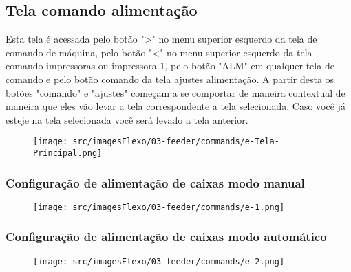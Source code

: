 \thispagestyle{fancy}
\vspace*{40 pt}
\subsection{Tela comando alimentação}\label{telaComandoAlimentacao}
 Esta tela é acessada pelo botão "\textgreater" no menu superior esquerdo da tela de comando de máquina, pelo botão "\textless{}" no menu superior esquerdo da tela 
 comando impressoras ou impressora 1, pelo botão "ALM" em qualquer tela de comando e pelo botão comando da tela ajustes alimentação. A partir desta os botões "comando" 
 e "ajustes" começam a se comportar de maneira contextual de maneira que eles vão levar a tela correspondente a tela selecionada. Caso você já esteje na tela selecionada 
 você será levado a tela anterior.
 \vspace*{\fill}
\begin{figure}[h]
  \centering
  \texttt{[image: src/imagesFlexo/03-feeder/commands/e-Tela-Principal.png]}
\end{figure}
\vspace*{\fill}

\newpage
\thispagestyle{fancy}
\vspace*{40 pt}
\subsubsection{\small{Configuração de alimentação de caixas modo manual}}\label{telaComandoAlimentacaoConfiguracaoDeAlimentacaoDeCaixasModoManual}
\vspace*{\fill}
\begin{figure}[h]
  \centering
  \texttt{[image: src/imagesFlexo/03-feeder/commands/e-1.png]}
\end{figure}
\vspace*{\fill}


\newpage
\thispagestyle{fancy}
\vspace*{40 pt}
\subsubsection{\small{Configuração de alimentação de caixas modo automático}}\label{telaComandoAlimentacaoConfiguracaoDeAlimentacaoDeCaixasModoAutomatico}
\vspace*{\fill}
\begin{figure}[h]
  \centering
  \texttt{[image: src/imagesFlexo/03-feeder/commands/e-2.png]}
\end{figure}
\vspace*{\fill}

